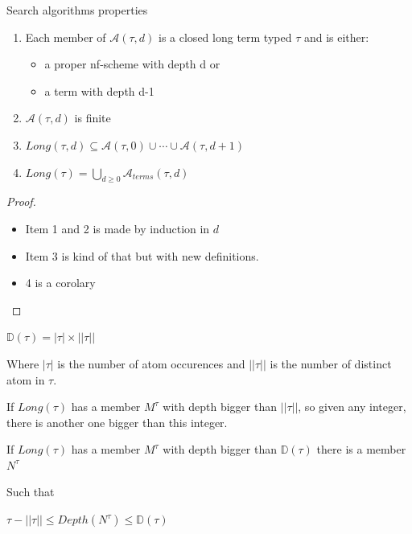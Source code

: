 \begin{frame}{Search algorithms properties}
	\begin{lem}
     \begin{enumerate}
           \item Each member of $\mathcal{A}(\tau,d)$ is a closed long
             term typed $\tau$ and is either:
             \begin{itemize}
                     \item a proper nf-scheme with depth d or
                     \item a term with depth d-1
              \end{itemize}
              \item $\mathcal{A}(\tau,d)$ is finite
               \item $Long(\tau,d) \subseteq \mathcal{A}(\tau,0) \cup \cdots
                 \cup\mathcal{A}(\tau,d+1)$
                 \item $Long(\tau) = \bigcup_{d \geq 0} \mathcal{A}_{terms}(\tau,d)$
      \end{enumerate}
      \end{lem}

      \begin{proof}
             \begin{itemize}
                      \item Item 1 and 2 is made by induction in $d$
                      \item Item 3 is kind of that but with new
                        definitions.
                       \item 4 is a corolary
             \end{itemize}
      \end{proof}
      
\end{frame}

\begin{frame}
  \begin{mydef}
        $\mathbb{D}(\tau) = |\tau| \times ||\tau||$

        Where $|\tau|$ is the number of atom occurences and $||\tau||$
        is the number of distinct atom in $\tau$.
  \end{mydef}

  \begin{lem}
      If $Long(\tau)$ has a member $M^{\tau}$ with depth bigger
      than $||\tau||$, so given any integer, there is another one
      bigger than this integer.
   \end{lem}

   \begin{lem}
            If $Long(\tau)$ has a member $M^{\tau}$ with depth bigger
            than $\mathbb{D}(\tau)$ there is a member $N^{\tau}$

            Such that

            $\mathbb{\tau}-||\tau|| \leq Depth(N^{\tau}) \leq \mathbb{D}(\tau)$
    \end{lem}

\end{frame}


